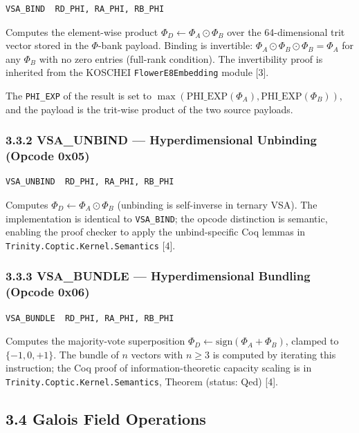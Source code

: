 \begin{verbatim}
VSA_BIND  RD_PHI, RA_PHI, RB_PHI
\end{verbatim}

Computes the element-wise product
\(\Phi_D \leftarrow \Phi_A \odot \Phi_B\) over the 64-dimensional
trit vector stored in the $\Phi$-bank payload. Binding is
invertible:
\(\Phi_A \odot \Phi_B \odot \Phi_B = \Phi_A\) for any
\(\Phi_B\) with no zero entries (full-rank condition). The
invertibility proof is inherited from the KOSCHEI
\texttt{FlowerE8Embedding} module [3].

The \texttt{PHI\_EXP} of the result is set to
\(\max(\text{PHI\_EXP}(\Phi_A), \text{PHI\_EXP}(\Phi_B))\),
and the payload is the trit-wise product of the two source
payloads.

\subsubsection{3.3.2 VSA\_UNBIND --- Hyperdimensional Unbinding (Opcode 0x05)}

\begin{verbatim}
VSA_UNBIND  RD_PHI, RA_PHI, RB_PHI
\end{verbatim}

Computes \(\Phi_D \leftarrow \Phi_A \odot \Phi_B\) (unbinding
is self-inverse in ternary VSA). The implementation is identical
to \texttt{VSA\_BIND}; the opcode distinction is semantic,
enabling the proof checker to apply the unbind-specific Coq
lemmas in \texttt{Trinity.Coptic.Kernel.Semantics} [4].

\subsubsection{3.3.3 VSA\_BUNDLE --- Hyperdimensional Bundling (Opcode 0x06)}

\begin{verbatim}
VSA_BUNDLE  RD_PHI, RA_PHI, RB_PHI
\end{verbatim}

Computes the majority-vote superposition
\(\Phi_D \leftarrow \text{sign}(\Phi_A + \Phi_B)\), clamped to
\(\{-1, 0, +1\}\). The bundle of \(n\) vectors with \(n \geq 3\)
is computed by iterating this instruction; the Coq proof of
information-theoretic capacity scaling is in
\texttt{Trinity.Coptic.Kernel.Semantics}, Theorem
 (status: Qed) [4].

\subsection{3.4 Galois Field Operations}\label{fa_71:gf16-operations}

